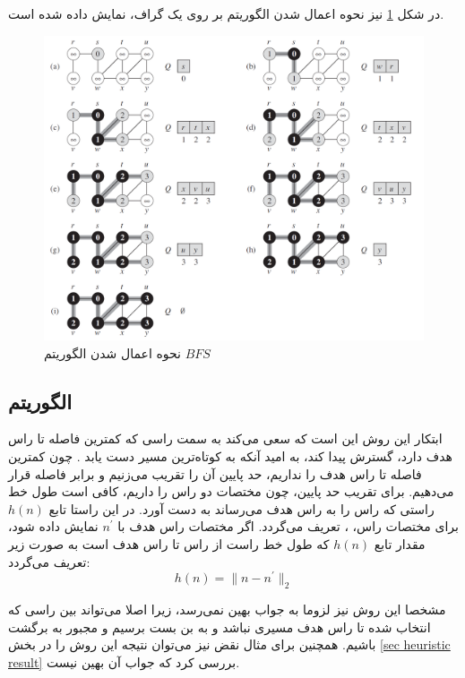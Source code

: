  در شکل \ref{Fig BFS representation} نیز نحوه اعمال شدن الگوریتم  بر روی یک گراف، نمایش داده شده است.
\begin{figure}[!h]
	\centering
	\includegraphics[scale=0.4]{Images/BFS-representation.png}
	\caption{نحوه اعمال شدن الگوریتم $BFS$}\label{Fig BFS representation}
\end{figure}


\newpage
\subsection{الگوریتم }
ابتکار این روش این است که سعی می‌کند به سمت راسی که کمترین فاصله تا راس هدف دارد، گسترش پیدا کند، به امید آنکه به کوتاه‌ترین مسیر دست یابد \cite{russell2002artificial}. چون کمترین فاصله تا راس هدف را نداریم، حد پایین آن‌ را تقریب می‌زنیم و برابر فاصله قرار می‌دهیم. برای تقریب حد پایین، چون مختصات دو راس را داریم، کافی است طول خط راستی که راس را به راس هدف می‌رساند به دست آورد. در این راستا تابع $h(n)$ برای مختصات راس، ، تعریف می‌گردد. اگر مختصات راس هدف با $n^\prime$ نمایش داده شود، مقدار تابع $h(n)$ که طول خط راست از راس تا راس هدف است به صورت زیر تعریف می‌گردد:
\begin{equation}\label{eq heuristic h}
h(n) = \|n - n^\prime\|_2
\end{equation}

مشخصا این روش نیز لزوما به جواب بهین نمی‌رسد، زیرا اصلا می‌تواند بین راسی که انتخاب شده تا راس هدف مسیری نباشد و به بن بست برسیم و مجبور به برگشت باشیم. همچنین برای مثال نقض نیز می‌توان نتیجه این روش را در بخش \ref{sec heuristic result} بررسی کرد که جواب آن بهین نیست.

